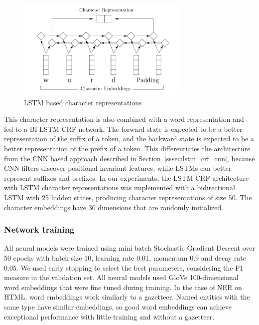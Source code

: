 \documentclass{nle}
\begin{document}
\begin{figure}[h]
  \centering
  \includegraphics[width=0.75\textwidth]{pics/lstm_char_representations}
  \caption{LSTM based character representations}
  \label{fig:lstm_char}
\end{figure}

This character representation is also combined with a word 
representation and fed to a BI-LSTM-CRF network. 
The forward state is expected to be a better representation of the suffix of 
a token, and the backward state is expected to be a better representation of 
the prefix of a token. This differentiates the architecture
from the CNN based approach described in Section~\ref{sssec:lstm_crf_cnn}, because CNN filters 
discover positional invariant features, while LSTMs can better represent 
suffixes and prefixes. In our experiments, 
the LSTM-CRF architecture with LSTM character representations was implemented with a bidirectional 
LSTM with 25 hidden states, producing character representations of 
size 50. The character embeddings have 30 dimensions that are randomly initialized.

\subsubsection{Network training}

All neural models were trained using mini batch Stochastic Gradient Descent over 50 epochs with batch size 10,
learning rate 0.01, momentum 0.9 and decay rate 0.05. We used early stopping \cite{Caruana2000} to select the best 
parameters, considering the F1 measure in the validation set. All neural models used 
GloVe 100-dimensional word embeddings \cite{Pennington2014} that were fine tuned during training.
In the case of NER on HTML, word embeddings work similarly to a gazetteer. Named entities 
with the same type have similar embeddings, so good word embeddings can achieve exceptional 
performance with little training and without a gazetteer. 
\end{document}
